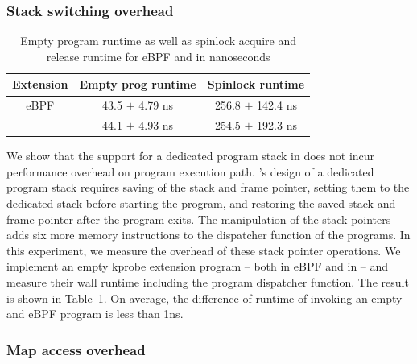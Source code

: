 \subsubsection{Stack switching overhead}
\begin{table}[t]
    \small
    \centering
    \begin{tabular}{ccc}%
        \toprule
        \textbf{Extension} & \textbf{Empty prog runtime} & \textbf{Spinlock runtime} \\
        \midrule
        eBPF & 43.5 $\pm$ 4.79 ns & 256.8 $\pm$ 142.4 ns\\
        \projname{} & 44.1 $\pm$ 4.93 ns & 254.5 $\pm$ 192.3 ns\\
        \bottomrule
    \end{tabular}
    \caption{Empty program runtime as well as spinlock acquire and release
        runtime for eBPF and \projname{} in nanoseconds}
    \vspace{-25pt}
    \label{tab:startup-cleanup}
\end{table}

We show that the support for a dedicated program stack in \projname{} does
    not incur performance overhead on program execution path.
\projname{}'s design of a dedicated program stack requires saving of the stack
    and frame pointer, setting them to the dedicated stack before starting
    the program,
    and restoring the saved stack and frame pointer after the program exits.
The manipulation of the stack pointers adds six more memory instructions to
    the dispatcher function of the \projname{} programs.
In this experiment, we measure the overhead of these stack pointer operations.
We implement an empty kprobe extension program -- both in eBPF and in
    \projname{} -- and measure their wall runtime including the program
    dispatcher function.
The result is shown in Table~\ref{tab:startup-cleanup}.
On average, the difference of runtime of invoking an empty \projname{} and eBPF
    program is less than 1ns.

\subsubsection{Map access overhead}
\label{eval:inline}

